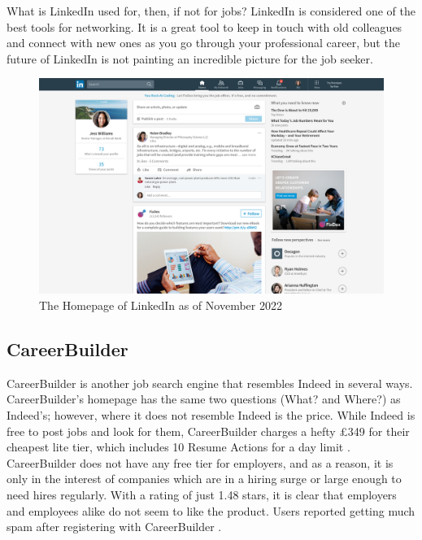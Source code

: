 What is LinkedIn used for, then, if not for jobs? LinkedIn is considered one of the best tools for networking. It is a great tool to keep in touch with old colleagues and connect with new ones as you go through your professional career, but the future of LinkedIn is not painting an incredible picture for the job seeker.

\begin{figure}
    \noindent
    \centering
    \includegraphics[width = 140mm]{Figures/LinkedInHomepage.png}
    \decoRule
    \caption[LinkedIn's Feed]{The Homepage of LinkedIn as of November 2022}
    \label{fig:LinkedIn Homepage}
\end{figure}

\newpage
\subsection{CareerBuilder}
CareerBuilder is another job search engine that resembles Indeed in several ways. CareerBuilder's homepage has the same two questions (What? and Where?) as Indeed's; however, where it does not resemble Indeed is the price. While Indeed is free to post jobs and look for them, CareerBuilder charges a hefty £349 for their cheapest lite tier, which includes 10 Resume Actions for a day limit \parencite{Reference15}. CareerBuilder does not have any free tier for employers, and as a reason, it is only in the interest of companies which are in a hiring surge or large enough to need hires regularly. With a rating of just 1.48 stars, it is clear that employers and employees alike do not seem to like the product. Users reported getting much spam after registering with CareerBuilder \parencite{Reference16}.

